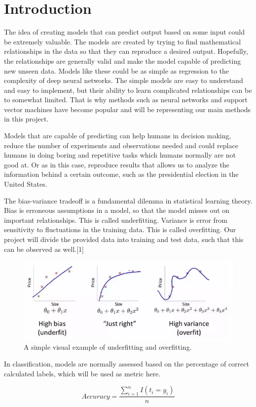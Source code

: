 \section{Introduction}
The idea of creating models that can predict output based on some input could be extremely valuable. The models are created by trying to find mathematical relationships in the data so that they can reproduce a desired output. Hopefully, the relationships are generally valid and make the model capable of predicting new unseen data. Models like these could be as simple as regression to the complexity of deep neural networks. The simple models are easy to understand and easy to implement, but their ability to learn complicated relationships can be to somewhat limited. That is why methods such as neural networks and support vector machines have become popular and will be representing our main methods in this project.
\\
\par
Models that are capable of predicting can help humans in decision making, reduce the number of experiments and observations needed and could replace humans in doing boring and repetitive tasks which humans normally are not good at. Or as in this case, reproduce results that allows us to analyze the information behind a certain outcome, such as the presidential election in the United States.  
\\
\par
The bias-variance tradeoff is a fundamental dilemma in statistical learning theory. Bias is erroneous assumptions in a model, so that the model misses out on important relationships. This is called underfitting. Variance is error from sensitivity to fluctuations in the training data. This is called overfitting. Our project will divide the provided data into training and test data, such that this can be observed as well.[1]

\begin{figure}[H]
\centering
\includegraphics[scale=0.6]{pictures/Bias_variance}
\caption{A simple visual example of underfitting and overfitting.}
\end{figure}

In classification, models are normally assessed based on the percentage of correct calculated labels, which will be used as metric here. 

\begin{equation}
Accuracy = \frac{\sum_{i=1}^n I(t_i=y_i)}{n}
\end{equation}